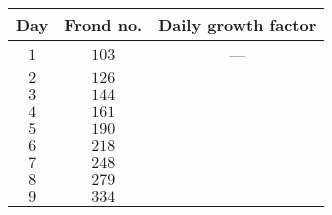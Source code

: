 \begin{tabular}{ccc}                    \toprule
Day & Frond no. & Daily growth factor \\\midrule
$1$ & $103$     & ---                 \\
$2$ & $126$ \\
$3$ & $144$ \\
$4$ & $161$ \\
$5$ & $190$ \\
$6$ & $218$ \\
$7$ & $248$ \\
$8$ & $279$ \\
$9$ & $334$ \\\bottomrule
\end{tabular}
